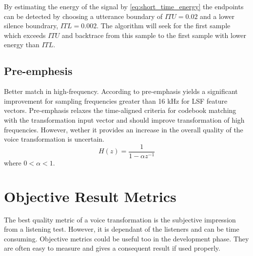 By estimating the energy of the signal by \eqref{eq:short_time_energy} the endpoints can be detected by choosing a utterance boundary of \eg $ITU=0.02$ and a lower silence boundrary, \eg $ITL=0.002$. The algorithm will seek for the first sample which exceeds $ITU$ and backtrace from this sample to the first sample with lower energy than $ITL$.



\subsection{Pre-emphesis} %
\label{sub:pre_emphesis}
Better match in high-frequency. According to \cite{turk06} pre-emphasis yields a significant improvement for sampling frequencies greater than 16 kHz for LSF feature vectors. Pre-emphasis relaxes the time-aligned criteria for codebook matching with the transformation input vector and should improve transformation of high frequencies. However, wether it provides an increase in the overall quality of the voice transformation is uncertain.
\begin{equation}
	\label{eq:pre_emphasis}
	H(z) = \frac{1}{1-\alpha z^{-1}}
\end{equation}
where $0<\alpha < 1$.

\section{Objective Result Metrics} %
\label{sec:objective_metrics}
The best quality metric of a voice transformation is the subjective impression from a listening test. However, it is dependant of the listeners and can be time consuming. Objective metrics could be useful too in the development phase. They are often easy to measure and gives a consequent result if used properly. 

